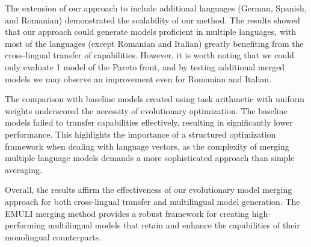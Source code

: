 The extension of our approach to include additional languages (German, Spanish, and Romanian) demonstrated the scalability of our method. The results showed that our approach could generate models proficient in multiple languages, with most of the languages (except Romanian and Italian) greatly benefiting from the cross-lingual transfer of capabilities. However, it is worth noting that we could only evaluate 1 model of the Pareto front, and by testing additional merged models we may observe an improvement even for Romanian and Italian.


The comparison with baseline models created using task arithmetic with uniform weights underscored the necessity of evolutionary optimization. The baseline models failed to transfer capabilities effectively, resulting in significantly lower performance. This highlights the importance of a structured optimization framework when dealing with language vectors, as the complexity of merging multiple language models demands a more sophisticated approach than simple averaging.

Overall, the results affirm the effectiveness of our evolutionary model merging approach for both cross-lingual transfer and multilingual model generation. The EMULI merging method provides a robust framework for creating high-performing multilingual models that retain and enhance the capabilities of their monolingual counterparts. 